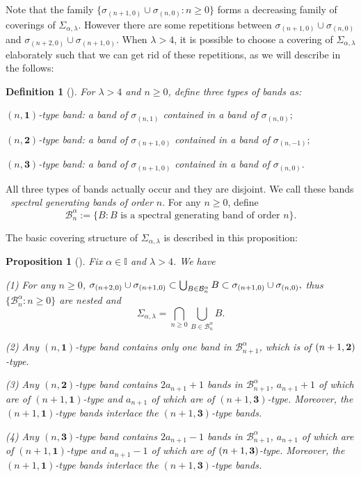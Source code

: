 \documentclass[reqno,11pt,graphicx,]{amsart}
\numberwithin{equation}{section}
\theoremstyle{plain}
\newcommand{\3}{\mathbf{3}}
\newtheorem{proposition}[theorem]{Proposition}
\newtheorem{definition}[theorem]{Definition}
\begin{document}
	Note that the family $\{\sigma_{(n+1,0)}\cup\sigma_{(n,0)}:n\ge 0\}$ forms a decreasing family of coverings of $\Sigma_{\alpha,\lambda}$. However there are some repetitions between $%
	\sigma_{(n+1,0)}\cup\sigma_{(n,0)}$ and $\sigma_{(n+2,0)}\cup\sigma_{(n+1,0)}$. When $\lambda>4$, it is possible to choose a covering of $\Sigma_{\alpha,\lambda}$ elaborately such
	that we can get rid of these repetitions, as we will describe in the follows:
	
	\begin{definition}[\protect\cite{LW2004,Ra1997}]
		For $\lambda>4$ and $n\ge0$, define three types of bands as:
		
		$(n,\mathbf{1})$-type band: a band of $\sigma_{(n,1)}$ contained in
		a band of $\sigma_{(n,0)};$
		
		$(n,\mathbf{2})$-type band: a band of $\sigma_{(n+1,0)}$ contained
		in a band of $\sigma_{(n,-1)};$
		
		$(n,\mathbf{3})$-type band: a band of $\sigma_{(n+1,0)}$ contained
		in a band of $\sigma_{(n,0)}.$
	\end{definition}
	
	All three types of bands actually occur and they are disjoint. We call these
	bands \emph{\ spectral generating bands of order $n$}. For any $n\ge0$,
	define 
	\begin{equation*}
		{\mathcal{B}}_n^\alpha:=\{B: B \text{ is a spectral generating band of
			order } n\}.
	\end{equation*}
	
	The basic covering structure of $\Sigma_{\alpha,\lambda}$ is described in this
	proposition:
	
	\begin{proposition}[\protect\cite{LW2004,Ra1997}]
		\label{basic-struc} Fix $\alpha\in \mathbb{I}$ and $\lambda>4$. We have
		
		(1) For any $n\ge0$, 
		$
		\sigma_{(n+2,0)}\cup\sigma_{(n+1,0)}\subset \bigcup_{B\in{%
				\mathcal{B}}_n^\alpha}B \subset
		\sigma_{(n+1,0)}\cup\sigma_{(n,0)},
		$ thus $\{{\mathcal{B}}_n^\alpha:n\ge0\}$ are nested and 
		\begin{equation*}
			\Sigma_{\alpha,\lambda}=\bigcap_{n\ge0} \bigcup_{B\in{\mathcal{B}}_n^\alpha}B.
		\end{equation*}
		
		(2) Any $(n,\mathbf{1})$-type band contains
		only one band in ${\mathcal{B}}_{n+1}^\alpha$, which is of $(n+1,\mathbf{%
			2})$-type.
		
		(3) Any $(n,\mathbf{2})$-type band contains 
		$2a_{n+1}+1$ bands in ${\mathcal{B}}_{n+1}^\alpha$, $a_{n+1}+1$ of which
		are of $(n+1,\mathbf{1})$-type and $a_{n+1}$ of which are of $(n+1,\mathbf{3}%
		)$-type. Moreover, the $(n+1,\mathbf{1})$-type bands interlace the $(n+1,\mathbf{3})$-type bands.
		
		(4) Any $(n,\mathbf{3})$-type band contains 
		$2a_{n+1}-1$ bands in ${\mathcal{B}}_{n+1}^\alpha$, $a_{n+1}$ of which
		are of $(n+1,\mathbf{1})$-type and $a_{n+1}-1$ of which are of $(n+1,\mathbf{%
			3})$-type. Moreover, the $(n+1,\mathbf{1})$-type bands interlace the $(n+1,%
		\mathbf{3})$-type bands.
	\end{proposition}
	
\end{document}
